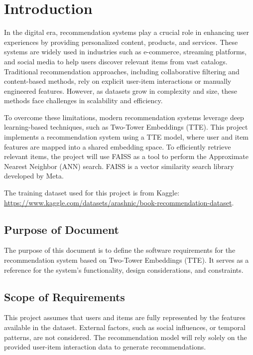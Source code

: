 \documentclass[12pt]{article}
\begin{document}
\section{Introduction}
In the digital era, recommendation systems play a crucial role in enhancing user experiences by providing personalized content, products, and services. These systems are widely used in industries such as e-commerce, streaming platforms, and social media to help users discover relevant items from vast catalogs. Traditional recommendation approaches, including collaborative filtering and content-based methods, rely on explicit user-item interactions or manually engineered features. However, as datasets grow in complexity and size, these methods face challenges in scalability and efficiency.

To overcome these limitations, modern recommendation systems leverage deep learning-based techniques, such as Two-Tower Embeddings (TTE). This project implements a recommendation system using a TTE model, where user and item features are mapped into a shared embedding space. To efficiently retrieve relevant items, the project will use FAISS as a tool to perform the Approximate Nearest Neighbor (ANN) search. FAISS is a vector similarity search library developed by Meta.

The training dataset used for this project is from Kaggle: \url{https://www.kaggle.com/datasets/arashnic/book-recommendation-dataset}.

\subsection{Purpose of Document}

The purpose of this document is to define the software requirements for the recommendation system based on Two-Tower Embeddings (TTE). It serves as a reference for the system’s functionality, design considerations, and constraints.

\subsection{Scope of Requirements} 

This project assumes that users and items are fully represented by the features available in the dataset. External factors, such as social influences, or temporal patterns, are not considered. The recommendation model will rely solely on the provided user-item interaction data to generate recommendations.
\end{document}
